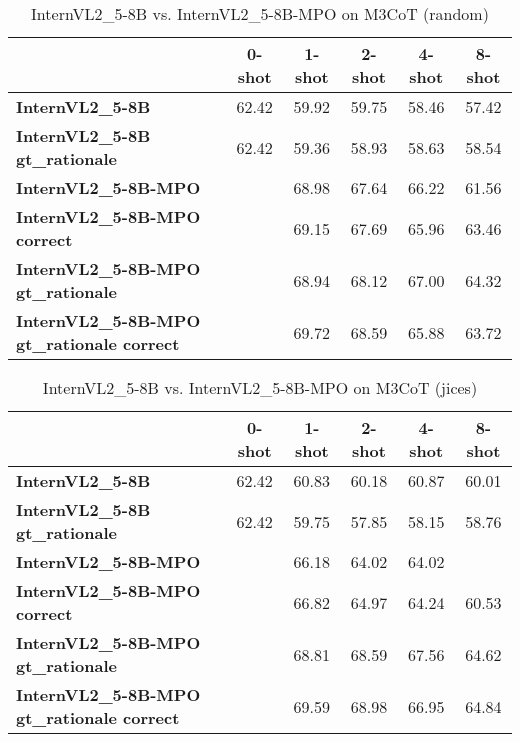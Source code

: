 \begin{table}
\caption{InternVL2\_5-8B vs. InternVL2\_5-8B-MPO on M3CoT (random)}
\label{tab:InternVL2_5-8B_M3CoT_TRAIN_random}
\begin{tabular}{lccccc}
\toprule
 & 0-shot & 1-shot & 2-shot & 4-shot & 8-shot \\
\midrule
\textbf{InternVL2\_5-8B} & 62.42 & 59.92 & 59.75 & 58.46 & 57.42 \\
\textbf{InternVL2\_5-8B gt\_rationale} & 62.42 & 59.36 & 58.93 & 58.63 & 58.54 \\
\textbf{InternVL2\_5-8B-MPO} &  & 68.98 & 67.64 & 66.22 & 61.56 \\
\textbf{InternVL2\_5-8B-MPO correct} &  & 69.15 & 67.69 & 65.96 & 63.46 \\
\textbf{InternVL2\_5-8B-MPO gt\_rationale} &  & 68.94 & 68.12 & 67.00 & 64.32 \\
\textbf{InternVL2\_5-8B-MPO gt\_rationale correct} &  & 69.72 & 68.59 & 65.88 & 63.72 \\
\bottomrule
\end{tabular}
\end{table}


\begin{table}
\caption{InternVL2\_5-8B vs. InternVL2\_5-8B-MPO on M3CoT (jices)}
\label{tab:InternVL2_5-8B_M3CoT_TRAIN_jices}
\begin{tabular}{lccccc}
\toprule
 & 0-shot & 1-shot & 2-shot & 4-shot & 8-shot \\
\midrule
\textbf{InternVL2\_5-8B} & 62.42 & 60.83 & 60.18 & 60.87 & 60.01 \\
\textbf{InternVL2\_5-8B gt\_rationale} & 62.42 & 59.75 & 57.85 & 58.15 & 58.76 \\
\textbf{InternVL2\_5-8B-MPO} &  & 66.18 & 64.02 & 64.02 &  \\
\textbf{InternVL2\_5-8B-MPO correct} &  & 66.82 & 64.97 & 64.24 & 60.53 \\
\textbf{InternVL2\_5-8B-MPO gt\_rationale} &  & 68.81 & 68.59 & 67.56 & 64.62 \\
\textbf{InternVL2\_5-8B-MPO gt\_rationale correct} &  & 69.59 & 68.98 & 66.95 & 64.84 \\
\bottomrule
\end{tabular}
\end{table}
